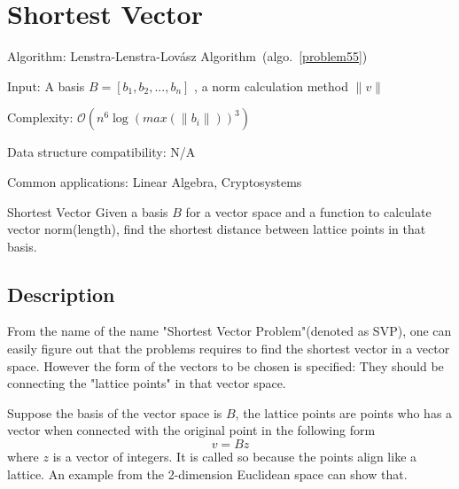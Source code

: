 \documentclass{article}
\begin{document}
\fi

%
%

\def\pbname{Shortest Vector} %

\section{\pbname} 

\begin{overview}
\item [Algorithm:] Lenstra-Lenstra-Lov\'asz Algorithm~(algo.~\ref{problem55})
\item [Input:] A basis $B = [b_1,b_2,...,b_n]$ , a norm calculation method $\|v\|$
\item [Complexity:] $\mathcal{O}(n^6\log{(max(\|b_i\|))}^3)$
\item [Data structure compatibility:] N/A
\item [Common applications:] Linear Algebra, Cryptosystems
\end{overview}



\begin{problem}{\pbname}
	Given a basis $B$ for a vector space and a function to calculate vector norm(length), find the shortest distance between lattice points in that basis.
\end{problem}

\subsection*{Description}

From the name of the name "Shortest Vector Problem"(denoted as SVP), one can easily figure out that the problems requires to find the shortest vector in a vector space. However the form of the vectors to be chosen is specified: They should be connecting the "lattice points" in that vector space.

Suppose the basis of the vector space is $B$, the lattice points are points who has a vector when connected with the original point in the following form $$v = Bz$$ where $z$ is a vector of integers. It is called so because the points align like a lattice. An example from the 2-dimension Euclidean space can show that.
\end{document}
